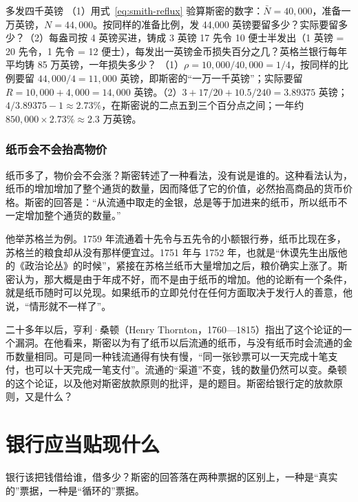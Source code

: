 \begin{example}{多发四千英镑}\label{ex:smith-excess}
（1）用式~\eqref{eq:smith-reflux} 验算斯密的数字：$\bar N=40{,}000$，准备一万英镑，$N=44{,}000$。按同样的准备比例，发 44,000 英镑要留多少？实际要留多少？（2）每盎司按 4 英镑买进，铸成 3 英镑 17 先令 10 便士半发出（1 英镑 = 20 先令，1 先令 = 12 便士），每发出一英镑金币损失百分之几？英格兰银行每年平均铸 85 万英镑，一年损失多少？
\solution （1）$\rho=10{,}000/40{,}000=1/4$，按同样的比例要留 $44{,}000/4=11{,}000$ 英镑，即斯密的“一万一千英镑”；实际要留 $R=10{,}000+4{,}000=14{,}000$ 英镑。（2）$3+17/20+10.5/240=3.89375$ 英镑；$4/3.89375-1\approx2.73\%$，在斯密说的二点五到三个百分点之间；一年约 $850{,}000\times2.73\%\approx2.3$ 万英镑。
\end{example}

\subsubsection{纸币会不会抬高物价}
纸币多了，物价会不会涨？斯密转述了一种看法，没有说是谁的。这种看法认为，纸币的增加增加了整个通货的数量，因而降低了它的价值，必然抬高商品的货币价格。斯密的回答是：“从流通中取走的金银，总是等于加进来的纸币，所以纸币不一定增加整个通货的数量。”\cite{smith1776}

他举苏格兰为例。1759 年流通着十先令与五先令的小额银行券，纸币比现在多，苏格兰的粮食却从没有那样便宜过。1751 年与 1752 年，也就是“休谟先生出版他的《政治论丛》的时候”，紧接在苏格兰纸币大量增加之后，粮价确实上涨了。斯密认为，那大概是由于年成不好，而不是由于纸币的增加\cite{smith1776}。他的论断有一个条件，就是纸币随时可以兑现。如果纸币的立即兑付在任何方面取决于发行人的善意，他说，“情形就不一样了”\cite{smith1776}。

二十多年以后，亨利·桑顿（Henry Thornton，1760—1815）指出了这个论证的一个漏洞。在他看来，斯密以为有了纸币以后流通的纸币，与没有纸币时会流通的金币数量相同\cite{thornton1802}。可是同一种钱流通得有快有慢，“同一张钞票可以一天完成十笔支付，也可以十天完成一笔支付”\cite{thornton1802}。流通的“渠道”不变，钱的数量仍然可以变。桑顿的这个论证，以及他对斯密放款原则的批评，是的题目。斯密给银行定的放款原则，又是什么？

\section{银行应当贴现什么}\label{sec:smith-realbills}

银行该把钱借给谁，借多少？斯密的回答落在两种票据的区别上，一种是“真实的”票据，一种是“循环的”票据。

